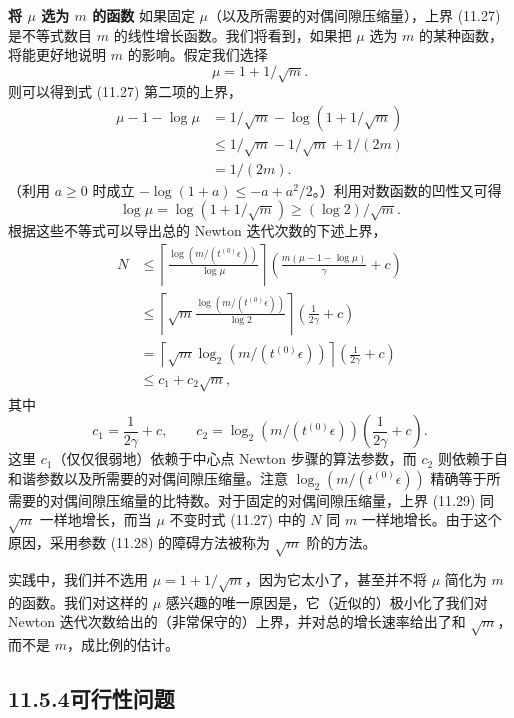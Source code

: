 \documentclass[UTF8, 12pt, fontset=fandol, oneside]{ctexart}
\begin{document}
\noindent\textbf{将 $\mu$ 选为 $m$ 的函数}\quad
如果固定 $\mu$（以及所需要的对偶间隙压缩量），上界 (11.27) 是不等式数目 $m$ 的线性增长函数。我们将看到，如果把 $\mu$ 选为 $m$ 的某种函数，将能更好地说明 $m$ 的影响。假定我们选择
\begin{equation}
\mu=1+1/\sqrt{m}.
\tag{11.28}
\end{equation}
则可以得到式 (11.27) 第二项的上界，
\[
\begin{aligned}
\mu-1-\log\mu
&=1/\sqrt{m}-\log(1+1/\sqrt{m})\\
&\leq 1/\sqrt{m}-1/\sqrt{m}+1/(2m)\\
&=1/(2m).
\end{aligned}
\]
（利用 $a\geq 0$ 时成立 $-\log(1+a)\leq -a+a^2/2$。）利用对数函数的凹性又可得
\[
\log\mu=\log(1+1/\sqrt{m})\geq(\log 2)/\sqrt{m}.
\]
根据这些不等式可以导出总的 Newton 迭代次数的下述上界，
\begin{equation}
\begin{aligned}
N&\leq \left\lceil\frac{\log(m/(t^{(0)}\epsilon))}{\log\mu}\right\rceil
\left(\frac{m(\mu-1-\log\mu)}{\gamma}+c\right)\\
&\leq \left\lceil\sqrt{m}\frac{\log(m/(t^{(0)}\epsilon))}{\log 2}\right\rceil
\left(\frac{1}{2\gamma}+c\right)\\
&=\left\lceil\sqrt{m}\log_2(m/(t^{(0)}\epsilon))\right\rceil
\left(\frac{1}{2\gamma}+c\right)\\
&\leq c_1+c_2\sqrt{m},
\end{aligned}
\tag{11.29}
\end{equation}
其中
\[
c_1=\frac{1}{2\gamma}+c,\qquad
c_2=\log_2(m/(t^{(0)}\epsilon))\left(\frac{1}{2\gamma}+c\right).
\]
这里 $c_1$（仅仅很弱地）依赖于中心点 Newton 步骤的算法参数，而 $c_2$ 则依赖于自和谐参数以及所需要的对偶间隙压缩量。注意 $\log_2(m/(t^{(0)}\epsilon))$ 精确等于所需要的对偶间隙压缩量的比特数。对于固定的对偶间隙压缩量，上界 (11.29) 同 $\sqrt{m}$ 一样地增长，而当 $\mu$ 不变时式 (11.27) 中的 $N$ 同 $m$ 一样地增长。由于这个原因，采用参数 (11.28) 的障碍方法被称为 $\sqrt{m}$ 阶的方法。

实践中，我们并不选用 $\mu=1+1/\sqrt{m}$，因为它太小了，甚至并不将 $\mu$ 简化为 $m$ 的函数。我们对这样的 $\mu$ 感兴趣的唯一原因是，它（近似的）极小化了我们对 Newton 迭代次数给出的（非常保守的）上界，并对总的增长速率给出了和 $\sqrt{m}$，而不是 $m$，成比例的估计。

\subsection*{11.5.4\quad 可行性问题}
\end{document}
